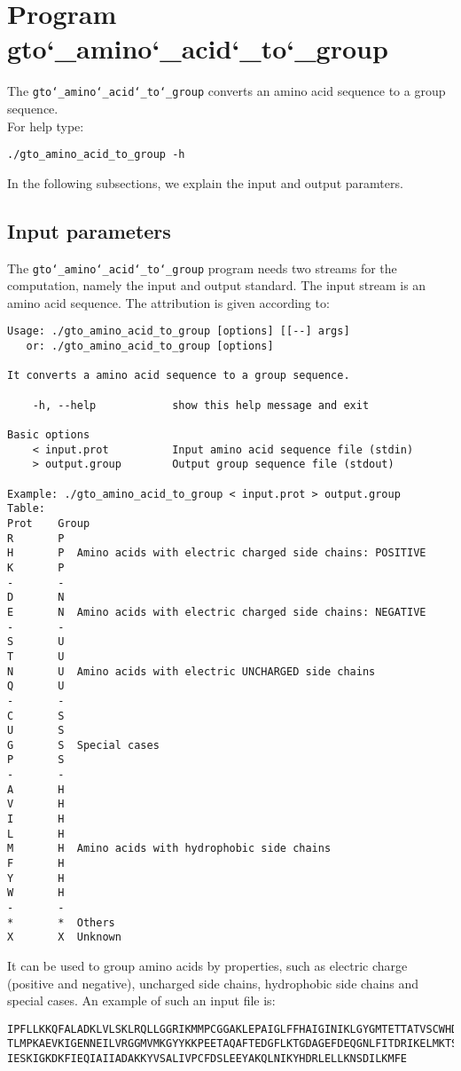 \section{Program gto\char`_amino\char`_acid\char`_to\char`_group}

The \texttt{gto\char`_amino\char`_acid\char`_to\char`_group} converts an amino acid sequence to a group 
sequence.\\
For help type:
\begin{lstlisting}
./gto_amino_acid_to_group -h
\end{lstlisting}
In the following subsections, we explain the input and output paramters.

\subsection*{Input parameters}

The \texttt{gto\char`_amino\char`_acid\char`_to\char`_group} program needs two streams for the computation, namely the input and output standard. The input stream is an amino acid sequence.
The attribution is given according to:
\begin{lstlisting}
Usage: ./gto_amino_acid_to_group [options] [[--] args]
   or: ./gto_amino_acid_to_group [options]

It converts a amino acid sequence to a group sequence.

    -h, --help            show this help message and exit

Basic options
    < input.prot          Input amino acid sequence file (stdin)
    > output.group        Output group sequence file (stdout)

Example: ./gto_amino_acid_to_group < input.prot > output.group
Table:
Prot	Group
R		P
H		P  Amino acids with electric charged side chains: POSITIVE
K		P
-		-
D		N
E		N  Amino acids with electric charged side chains: NEGATIVE
-		-
S		U
T		U
N		U  Amino acids with electric UNCHARGED side chains
Q		U
-		-
C		S
U		S
G		S  Special cases
P		S
-		-
A		H
V		H
I		H
L		H
M		H  Amino acids with hydrophobic side chains
F		H
Y		H
W		H
-		-
*		*  Others
X		X  Unknown
\end{lstlisting}
It can be used to group amino acids by properties, such as electric charge (positive
and negative), uncharged side chains, hydrophobic side chains and special cases.
An example of such an input file is:
\begin{lstlisting}
IPFLLKKQFALADKLVLSKLRQLLGGRIKMMPCGGAKLEPAIGLFFHAIGINIKLGYGMTETTATVSCWHDFQFNPNSIG
TLMPKAEVKIGENNEILVRGGMVMKGYYKKPEETAQAFTEDGFLKTGDAGEFDEQGNLFITDRIKELMKTSNGKYIAPQY
IESKIGKDKFIEQIAIIADAKKYVSALIVPCFDSLEEYAKQLNIKYHDRLELLKNSDILKMFE
\end{lstlisting}

